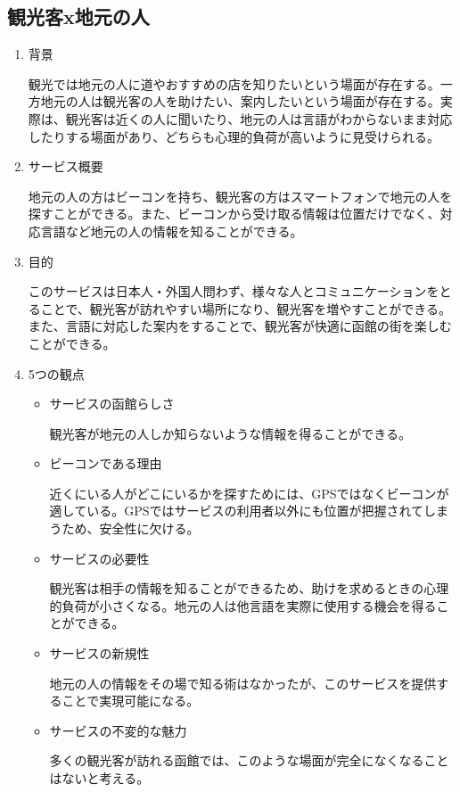 \subsection{観光客x地元の人}
\begin{enumerate}
    \item 背景
    \par 観光では地元の人に道やおすすめの店を知りたいという場面が存在する。一方地元の人は観光客の人を助けたい、案内したいという場面が存在する。実際は、観光客は近くの人に聞いたり、地元の人は言語がわからないまま対応したりする場面があり、どちらも心理的負荷が高いように見受けられる。
    \item サービス概要
    \par 地元の人の方はビーコンを持ち、観光客の方はスマートフォンで地元の人を探すことができる。また、ビーコンから受け取る情報は位置だけでなく、対応言語など地元の人の情報を知ることができる。
    \item 目的
    \par このサービスは日本人・外国人問わず、様々な人とコミュニケーションをとることで、観光客が訪れやすい場所になり、観光客を増やすことができる。また、言語に対応した案内をすることで、観光客が快適に函館の街を楽しむことができる。
    \item 5つの観点
    \begin{itemize}
        \item サービスの函館らしさ
        \par 観光客が地元の人しか知らないような情報を得ることができる。
        \item ビーコンである理由
        \par 近くにいる人がどこにいるかを探すためには、GPSではなくビーコンが適している。GPSではサービスの利用者以外にも位置が把握されてしまうため、安全性に欠ける。
        \item サービスの必要性
        \par 観光客は相手の情報を知ることができるため、助けを求めるときの心理的負荷が小さくなる。地元の人は他言語を実際に使用する機会を得ることができる。
        \item サービスの新規性
        \par 地元の人の情報をその場で知る術はなかったが、このサービスを提供することで実現可能になる。
        \item サービスの不変的な魅力
        \par 多くの観光客が訪れる函館では、このような場面が完全になくなることはないと考える。
    \end{itemize}
\end{enumerate}

